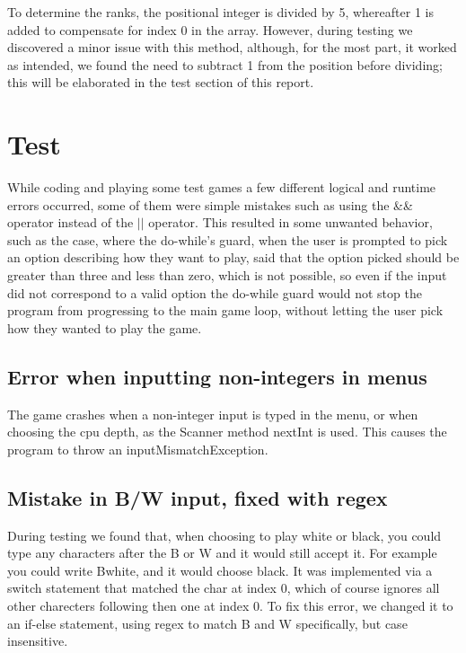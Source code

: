 \documentclass[12pt, a4paper]{article}
\begin{document}
	To determine the ranks, the positional integer is divided by 5, whereafter 1 is added to compensate for index 0 in the array.
	However, during testing we discovered a minor issue with this method, although, for the most part, it worked as intended, we found the need to subtract 1 from the position before dividing; this will be elaborated in the test section of this report.
	
	\section{Test}
	
	While coding and playing some test games a few different logical and runtime errors occurred, some of them were simple mistakes such as using the \&\& operator instead of the \(||\) operator. This resulted in some unwanted behavior, such as the case, where the do-while's guard, when the user is prompted to pick an option describing how they want to play, said that the option picked should be greater than three and less than zero, which is not possible, so even if the input did not correspond to a valid option the do-while guard would not stop the program from progressing to the main game loop, without letting the user pick how they wanted to play the game.    
	
	\subsection{Error when inputting non-integers in menus}
	The game crashes when a non-integer input is typed in the menu, or when choosing the cpu depth, as the Scanner method nextInt is used. This causes the program to throw an inputMismatchException.
	
	\subsection{Mistake in B/W input, fixed with regex}
	During testing we found that, when choosing to play white or black, you could type any characters after the B or W and it would still accept it. For example you could write Bwhite, and it would choose black. It was implemented via a switch statement that matched the char at index 0, which of course ignores all other charecters following then one at index 0.
	To fix this error, we changed it to an if-else statement, using regex to match B and W specifically, but case insensitive.
	
\end{document}
